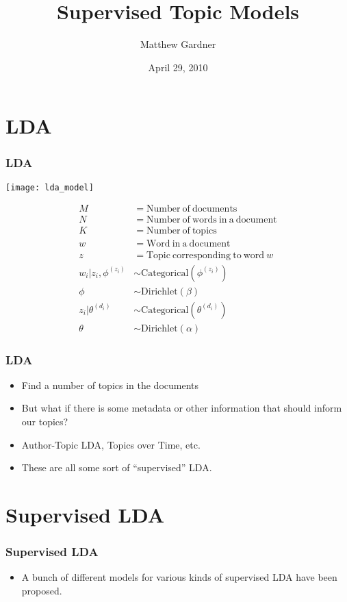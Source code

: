 \documentclass{beamer}
\author{Matthew Gardner}
\title{Supervised Topic Models}
\date{April 29, 2010}
\begin{document}
\begin{frame}
  \titlepage
\end{frame}

\section{LDA}

\begin{frame}
  \frametitle{LDA}
  \texttt{[image: lda\_model]}
  \parbox[b]{.7\linewidth}{
  \begin{align*} 
	M &= \mathrm{Number\ of\ documents} \\
	N &= \mathrm{Number\ of\ words\ in\ a\ document} \\
	K &= \mathrm{Number\ of\ topics} \\
	w &= \mathrm{Word\ in\ a\ document} \\
	z &= \mathrm{Topic\ corresponding\ to\ word\ } w \\
	w_i|z_i,\phi^{(z_i)} &\sim \mathrm{Categorical}(\phi^{(z_i)}) \\
	\phi &\sim \mathrm{Dirichlet}(\beta) \\
	z_i|\theta^{(d_i)} &\sim \mathrm{Categorical}(\theta^{(d_i)}) \\ 
	\theta &\sim \mathrm{Dirichlet}(\alpha) 
  \end{align*}
  }
\end{frame}

\begin{frame}
  \frametitle{LDA}
  \begin{itemize}
	\item Find a number of topics in the documents
	  \pause
	\item But what if there is some metadata or other information that should
	  inform our topics?
	  \pause
	\item Author-Topic LDA, Topics over Time, etc.
	  \pause
	\item These are all some sort of ``supervised'' LDA.
  \end{itemize}
\end{frame}

\section{Supervised LDA}

\begin{frame}
  \frametitle{Supervised LDA}
  \begin{itemize}
	\item A bunch of different models for various kinds of supervised LDA have
	  been proposed.
  \end{itemize}
\end{frame}
\end{document}
